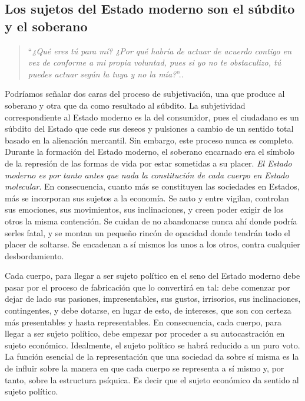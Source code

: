 \subsection{Los sujetos del Estado moderno son el súbdito y el soberano}
\label{sub:los-sujetos-del-estado-moderno-son-el-súdito-y-el-soberano}

\begin{quote}
  \enquote{\emph{¿Qué eres tú para mí? ¿Por qué habría de actuar de acuerdo contigo en vez de conforme a mi propia voluntad, pues si yo no te obstaculizo, tú puedes actuar según la tuya y no la mía?}}.\autocite[p.~63]{hobbesCiveElementosFilosoficos2016}. 
\end{quote}

Podríamos señalar dos caras del proceso de subjetivación, una que produce al soberano y otra que da como resultado al súbdito. La subjetividad correspondiente al Estado moderno es la del consumidor, pues el ciudadano es un súbdito del Estado que cede sus deseos y pulsiones a cambio de un sentido total basado en la alienación mercantil. Sin embargo, este proceso nunca es completo. Durante la formación del Estado moderno, el soberano encarnado era el símbolo de la represión de las formas de vida por estar sometidas a su placer. \emph{El Estado moderno es por tanto antes que nada la constitución de cada cuerpo en Estado molecular}. En consecuencia, cuanto más se constituyen las sociedades en Estados, más se incorporan sus sujetos a la economía. Se auto y entre vigilan, controlan sus emociones, sus movimientos, sus inclinaciones, y creen poder exigir de los otros la misma contención. Se cuidan de no abandonarse nunca ahí donde podría serles fatal, y se montan un pequeño rincón de opacidad donde tendrán todo el placer de soltarse. Se encadenan a sí mismos los unos a los otros, contra cualquier desbordamiento.

Cada cuerpo, para llegar a ser sujeto político en el seno del Estado moderno debe pasar por el proceso de fabricación que lo convertirá en tal: debe comenzar por dejar de lado sus pasiones, impresentables, sus gustos, irrisorios, sus inclinaciones, contingentes, y debe dotarse, en lugar de esto, de intereses, que son con certeza más presentables y hasta representables. En consecuencia, cada cuerpo, para llegar a ser sujeto político, debe empezar por proceder a su autocastración en sujeto económico. Idealmente, el sujeto político se habrá reducido a un puro voto. La función esencial de la representación que una sociedad da sobre sí misma es la de influir sobre la manera en que cada cuerpo se representa a sí mismo y, por tanto, sobre la estructura psíquica. Es decir que el sujeto económico da sentido al sujeto político.

